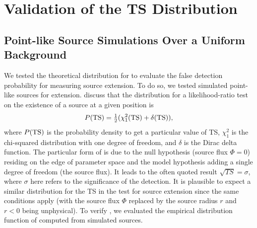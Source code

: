 \section{Validation of the TS Distribution}

\subsection{Point-like Source Simulations Over a Uniform Background}

We tested the theoretical distribution for \tsext
to evaluate the false detection probability for measuring source extension.
To do so, we tested simulated point-like sources for extension. 
\cite{mattox_1996_likelihood-analysis}
discuss that the \ts distribution for a likelihood-ratio test
on the existence of a source at a given position is
\begin{equation}\eqnlabel{ts_ext_distribution}
  P(\ts)=\tfrac{1}{2}(\chi^2_1(\ts)+\delta(\ts)),
\end{equation}
where $P(\mathrm{TS})$ is the probability density to get a particular value of TS,
$\chi^2_1$ is the chi-squared distribution with one degree of freedom, and
$\delta$ is the Dirac delta function.
The particular form of  is due to the
null hypothesis (source flux $\Phi=0$) residing on the edge of parameter
space and the model hypothesis adding a single degree of freedom (the source flux).
It leads to the often quoted result $\sqrt{TS}=\sigma$, where 
$\sigma$ here refers to the significance of the detection. It is plausible
to expect a similar distribution for the TS in the test for
source extension since the same conditions apply (with the source flux
$\Phi$ replaced by the source radius $r$ and $r<0$ being unphysical).
To verify , we evaluated the
empirical distribution function of \tsext computed from simulated sources.

